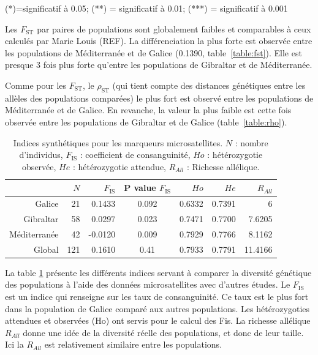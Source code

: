 \documentclass[a4paper,12pt,twoside]{article}\usepackage[]{graphicx}\usepackage[]{color}
\begin{document}
\begin {bibunit} [newbst]
\begin{table}[htpb]
\begin{center}
\begin{minipage}{.48\textwidth}
\end{minipage}
(*)=significatif à 0.05; (**) = significatif à 0.01; (***) = significatif à 0.001
\end{center}
\end{table}

Les $F_\textrm{ST}$ par paires de populations sont globalement faibles et comparables à ceux calculés par Marie Louis (REF). La différenciation la plus forte est observée entre les populations de Méditerranée et de Galice (0.1390, table~\ref{table:fst}). Elle est presque 3 fois plus forte qu'entre les populations de Gibraltar et de Méditerranée.

Comme pour les $F_\textrm{ST}$, le $\rho_\textrm{ST}$ (qui tient compte des distances génétiques entre les allèles des populations comparées) le plus fort est observé entre les populations de Méditerranée et de Galice. En revanche, la valeur la plus faible est cette fois observée entre les populations de Gibraltar et de Galice (table~\ref{table:rho}).

\begin{table}[htpb]
\centering
\caption[Indices synthétiques pour les marqueurs microsatellites.\label{micro}]{Indices synthétiques pour les marqueurs microsatellites. $N$ : nombre d'individus, $F_\textrm{IS}$ : coefficient de consanguinité, $Ho$ : hétérozygotie observée, $He$ : hétérozygotie attendue, $R_{All}$ : Richesse allélique.}
\label{micro}
\begin{tabular}{rrrcrrr}
\toprule
 & $N$ & $F_\textrm{IS}$ & P value $F_\textrm{IS}$  & $Ho$ & $He$ & $R_{All}$ \\
\hline
Galice 			&	21	&	0.1433	& 0.092 &	0.6332	&	0.7391	&	6 \\
Gibraltar 		&	58	&	0.0297	& 0.023 &	0.7471	&	0.7700	&	7.6205\\
Méditerranée 	&	42	&	-0.0120	& 0.009 &	0.7929	&	0.7766	&	8.1162 \\
\midrule
Global 			&	121	&	0.1610	& 0.41 &	0.7933	&	0.7791	&	11.4166 \\
\bottomrule
\end{tabular}
\end{table}

La table \ref{micro} présente les différents indices servant à comparer la diversité génétique des populations à l'aide des données microsatellites avec d'autres études. Le $F_\textrm{IS}$ est un indice qui renseigne sur les taux de consanguinité. Ce taux est le plus fort dans la population de Galice comparé aux autres populations. Les hétérozygoties attendues et observées (Ho) ont servis pour le calcul des Fis. La richesse allélique $R_{All}$ donne une idée de la diversité réelle des populations, et donc de leur taille. Ici la $R_{All}$ est relativement similaire entre les populations.


\end{bibunit}
\end{document}
